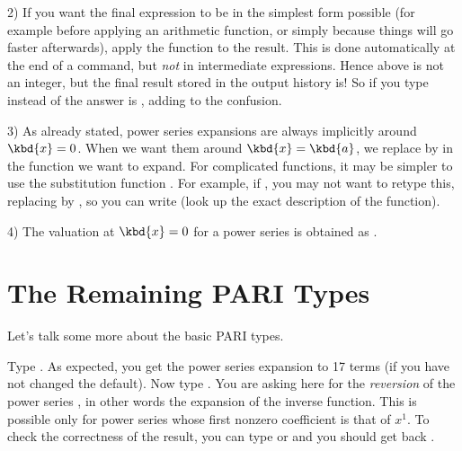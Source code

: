 2) If you want the final expression to be in the simplest form possible (for
example before applying an arithmetic function, or simply because things will
go faster afterwards), apply the function  to the result.
This is done automatically at the end of a  command, but
\emph{not} in intermediate expressions. Hence  above is not an
integer, but the final result stored in the output history is! So
if you type  instead of  the answer is
, adding to the confusion.

3) As already stated, power series expansions are always implicitly around
$\kbd{x} = 0$. When we want them around $\kbd{x} = \kbd{a}$, we replace
 by  in the function we want to expand. For complicated
functions, it may be simpler to use the substitution function .
For example, if ,
you may not want to retype this, replacing  by , so you can
write  (look up the exact description of the
 function).

4) The valuation at $\kbd{x} = 0$ for a power series  is obtained
as .

\section{The Remaining PARI Types}
Let's talk some more about the basic PARI types.

Type . As expected, you get the power series expansion
to 17 terms (if you have not changed the default). Now type
. You are asking here for the \emph{reversion} of the
power series , in other words the expansion of the inverse function.
This is possible only for power series whose first nonzero coefficient is
that of $x^1$.  To check the correctness of the result, you can type
 or  and you should get back
.

